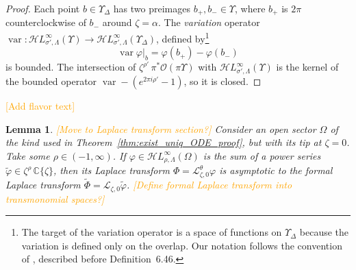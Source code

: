 \documentclass{article}
\newcommand{\singexp}[2]{\mathcal{H}L^\infty_{#1, #2}}
\newcommand{\maps}{\colon}
\newcommand{\C}{\mathbb{C}}
\DeclareMathOperator{\var}{var}
\newcommand{\series}[1]{\tilde{#1}}
\newcommand{\laplace}{\mathcal{L}}
\theoremstyle{definition}
\theoremstyle{plain}
\newtheorem{lemma}[definition]{Lemma}
\begin{document}
\begin{proof}
Each point $b \in \Upsilon_\Delta$ has two preimages $b_+, b_- \in \Upsilon$, where $b_+$ is $2\pi$ counterclockwise of $b_-$ around $\zeta = \alpha$. The {\em variation} operator $\var \maps \singexp{\sigma'}{\Lambda}(\Upsilon) \to \singexp{\sigma'}{\Lambda}(\Upsilon_\Delta)$, defined by\footnote{The target of the variation operator is a space of functions on $\Upsilon_\Delta$ because the variation is defined only on the overlap. Our notation follows the convention of \cite{diverg-resurg-i}, described before Definition~6.46.}
\[ \var \varphi \big|_b = \varphi(b_+) - \varphi(b_-) \]
is bounded. The intersection of $\zeta^{\rho'}\,\pi^*\mathcal{O}(\pi\Upsilon)$ with $\singexp{\sigma'}{\Lambda}(\Upsilon)$ is the kernel of the bounded operator $\var - (e^{2\pi i \rho'} - 1)$, so it is closed.
\end{proof}
\textcolor{orange}{[Add flavor text]}
\begin{lemma}\label{lem:laplace-bridge}
\textcolor{orange}{[Move to Laplace transform section?]} Consider an open sector $\Omega$ of the kind used in Theorem~\ref{thm:exist_uniq_ODE_proof}, but with its tip at $\zeta = 0$. Take some $\rho \in (-1,\infty)$. If $\varphi \in \singexp{\rho}{\Lambda}(\Omega)$ is the sum of a power series $\series{\varphi} \in \zeta^\rho\,\C\{\zeta\}$, then its Laplace transform $\Phi = \laplace_{\zeta, 0}^\theta \varphi$ is asymptotic to the formal Laplace transform $\series{\Phi} = \laplace_{\zeta, 0} \series{\varphi}$. \textcolor{orange}{[Define formal Laplace transform into transmonomial spaces?]}
\end{lemma}
\end{document}
